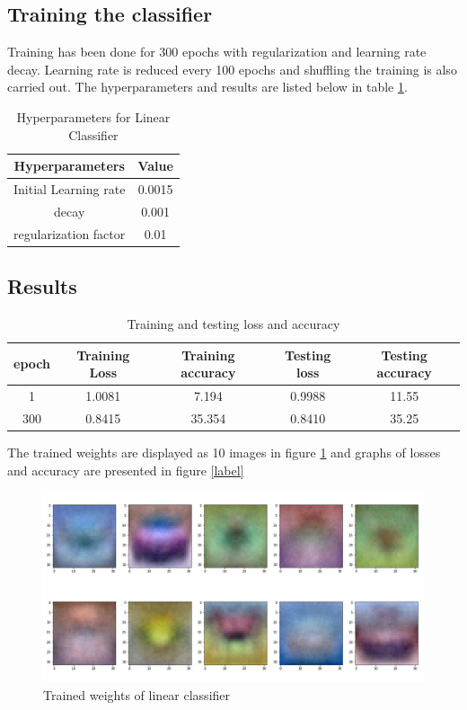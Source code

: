 \documentclass[a4paper, 12pt]{article}
\begin{document}
		\subsection{Training the classifier}
			Training has been done for 300 epochs with regularization and learning rate decay. Learning rate is reduced every 100 epochs and shuffling the training is also carried out. The hyperparameters and results are listed below in table \ref{param1}.
			\begin{table}
				\centering
				\begin{tabular}{|c|c|}
					\hline
					Hyperparameters & Value \\
					\hline
					Initial Learning rate & 0.0015 \\
					decay	& 0.001 \\
					regularization factor & 0.01 \\
					\hline
				\end{tabular}
				\label{param1}
				\caption{Hyperparameters for Linear Classifier}
			\end{table}
		\subsection{Results}
			\begin{table}
				\centering
				\begin{tabular}{|c|c|c|c|c|}
					\hline
					epoch & Training Loss & Training accuracy & Testing loss & Testing accuracy\\
					\hline
					1 & 1.0081 & 7.194 & 0.9988 & 11.55 \\
					300 & 0.8415 & 35.354 & 0.8410 & 35.25\\
					\hline
				\end{tabular}
				\caption{Training and testing loss and accuracy}
			\end{table}
			The trained weights are displayed as 10 images in figure \ref{fig:weights} and graphs of losses and accuracy are presented in figure \ref{label}
			\begin{figure}[h]
				\centering
				\includegraphics[scale = 0.4]{../images/weights}
				\caption{Trained weights of linear classifier}
				\label{fig:weights}
			\end{figure}
	
\end{document}
